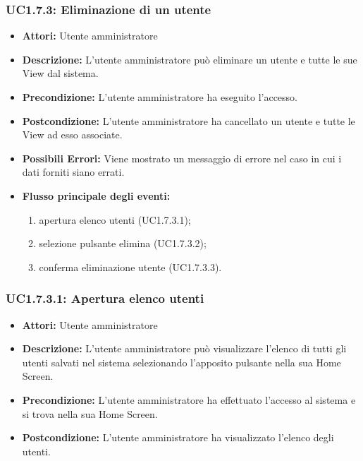 \subsubsection{UC1.7.3: Eliminazione di un utente}

\begin{itemize}
    \item \textbf{Attori:} Utente amministratore
    \item \textbf{Descrizione:} L'utente amministratore può eliminare un utente e tutte le sue View dal sistema.
    \item \textbf{Precondizione:} L'utente amministratore ha eseguito l'accesso.
    \item \textbf{Postcondizione:} L'utente amministratore ha cancellato un utente e tutte le View ad esso associate.
	\item \textbf{Possibili Errori:}
    Viene mostrato un messaggio di errore nel caso in cui i dati forniti siano errati.
    \item \textbf{Flusso principale degli eventi:}

    \begin{enumerate}
        \item apertura elenco utenti (UC1.7.3.1);
        \item selezione pulsante elimina (UC1.7.3.2);
        \item conferma eliminazione utente (UC1.7.3.3).
    \end{enumerate}

\end{itemize}

\subsubsection{UC1.7.3.1: Apertura elenco utenti}

\begin{itemize}
    \item \textbf{Attori:} Utente amministratore
    \item \textbf{Descrizione:} L'utente amministratore può visualizzare l'elenco di tutti gli utenti salvati nel sistema selezionando l'apposito pulsante nella sua Home Screen.
    \item \textbf{Precondizione:} L'utente amministratore ha effettuato l'accesso al sistema e si trova nella sua Home Screen.
    \item \textbf{Postcondizione:} L'utente amministratore ha visualizzato l'elenco degli utenti.
\end{itemize}

